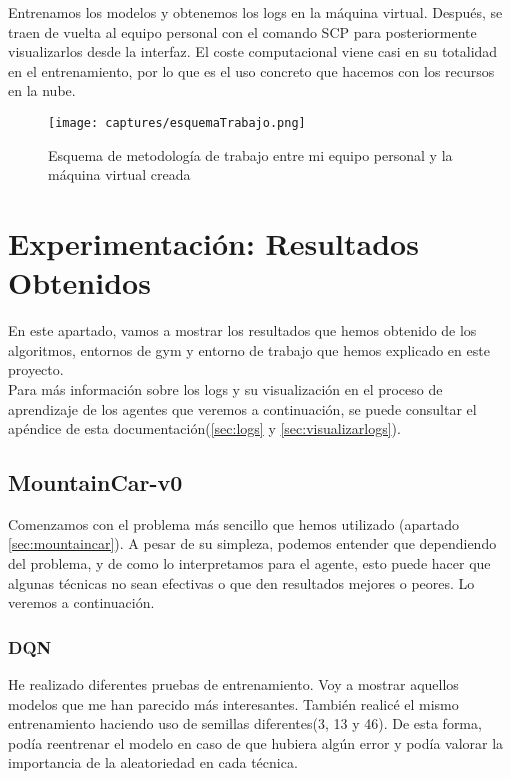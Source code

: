 \documentclass[11pt,fleqn]{book} %
\begin{document}
Entrenamos los modelos y obtenemos los logs en la máquina virtual. Después, se traen de vuelta al equipo personal con el comando SCP para posteriormente visualizarlos desde la interfaz. El coste computacional viene casi en su totalidad en el entrenamiento, por lo que es el uso concreto que hacemos con los recursos en la nube.

\begin{figure}[H]
	\centering\texttt{[image: captures/esquemaTrabajo.png]}
	\caption{Esquema de metodología de trabajo entre mi equipo personal y la máquina virtual creada}
	\label{fig:formaTrabajo} %
\end{figure} 

\chapter{Experimentación: Resultados Obtenidos}

En este apartado, vamos a mostrar los resultados que hemos obtenido de los algoritmos, entornos de gym y entorno de trabajo que hemos explicado en este proyecto. \\

Para más información sobre los logs y su visualización en el proceso de aprendizaje de los agentes que veremos a continuación, se puede consultar el apéndice de esta documentación(\ref{sec:logs} y \ref{sec:visualizarlogs}).

\section{MountainCar-v0}\label{sec:exp:mountaincar}

Comenzamos con el problema más sencillo que hemos utilizado (apartado \ref{sec:mountaincar}). A pesar de su simpleza, podemos entender que dependiendo del problema, y de como lo interpretamos para el agente, esto puede hacer que algunas técnicas no sean efectivas o que den resultados mejores o peores. Lo veremos a continuación. \\

\subsection{DQN}\label{sec:mountain:DQN}

He realizado diferentes pruebas de entrenamiento. Voy a mostrar aquellos modelos que me han parecido más interesantes. También realicé el mismo entrenamiento haciendo uso de semillas diferentes(3, 13 y 46). De esta forma, podía reentrenar el modelo en caso de que hubiera algún error y podía valorar la importancia de la aleatoriedad en cada técnica. \\
\end{document}
